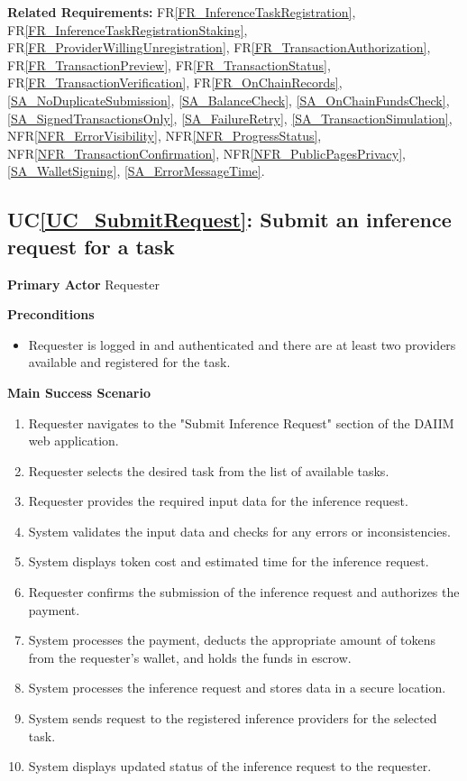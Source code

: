 \documentclass[12pt]{article}
\newcounter{ucnum} %
\newcommand{\ucref}[1]{UC\ref{#1}}
\newcommand{\rref}[1]{FR\ref{#1}}
\newcommand{\nfrref}[1]{NFR\ref{#1}}
\begin{document}
\textbf{Related Requirements:} \rref{FR_InferenceTaskRegistration}, \rref{FR_InferenceTaskRegistrationStaking}, \rref{FR_ProviderWillingUnregistration}, \rref{FR_TransactionAuthorization}, \rref{FR_TransactionPreview}, \rref{FR_TransactionStatus}, \rref{FR_TransactionVerification}, \rref{FR_OnChainRecords}, \ref{SA_NoDuplicateSubmission}, \ref{SA_BalanceCheck}, \ref{SA_OnChainFundsCheck}, \ref{SA_SignedTransactionsOnly}, \ref{SA_FailureRetry}, \ref{SA_TransactionSimulation}, \nfrref{NFR_ErrorVisibility}, \nfrref{NFR_ProgressStatus}, \nfrref{NFR_TransactionConfirmation}, \nfrref{NFR_PublicPagesPrivacy}, \ref{SA_WalletSigning}, \ref{SA_ErrorMessageTime}.

 \label{UC_SubmitRequest}
\subsection{\ucref{UC_SubmitRequest}: Submit an inference request for a task}

\textbf{Primary Actor}
Requester

\textbf{Preconditions}
\begin{itemize}
\item Requester is logged in and authenticated and there are at least two providers available and registered for the task.
\end{itemize}

\textbf{Main Success Scenario}
\begin{enumerate}
\item Requester navigates to the "Submit Inference Request" section of the DAIIM web application.
\item Requester selects the desired task from the list of available tasks.
\item Requester provides the required input data for the inference request.
\item System validates the input data and checks for any errors or inconsistencies.
\item System displays token cost and estimated time for the inference request.
\item Requester confirms the submission of the inference request and authorizes the payment.
\item System processes the payment, deducts the appropriate amount of tokens from the requester's wallet, and holds the funds in escrow.
\item System processes the inference request and stores data in a secure location.
\item System sends request to the registered inference providers for the selected task.
\item System displays updated status of the inference request to the requester.
\end{enumerate}
\end{document}

